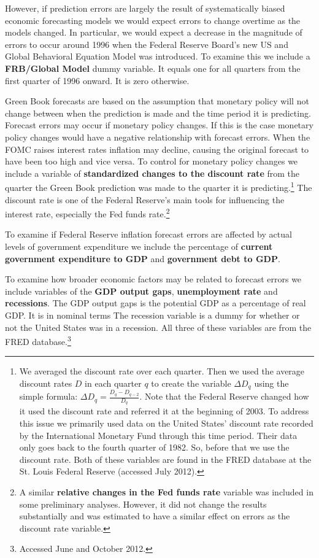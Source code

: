 \documentclass[a4paper]{article}
\begin{document}
However, if prediction errors are largely the result of systematically biased economic forecasting models we would expect errors to change overtime as the models changed. In particular, we would expect a decrease in the magnitude of errors to occur around 1996 when the Federal Reserve Board's new US and Global Behavioral Equation Model was introduced. To examine this we include a {\bf{FRB/Global Model}} dummy variable. It equals one for all quarters from the first quarter of 1996 onward. It is zero otherwise.

Green Book forecasts are based on the assumption that monetary policy will not change between when the prediction is made and the time period it is predicting. Forecast errors may occur if monetary policy changes. If this is the case monetary policy changes would have a negative relationship with forecast errors. When the FOMC raises interest rates inflation may decline, causing the original forecast to have been too high and vice versa. To control for monetary policy changes we include a variable of {\bf{standardized changes to the discount rate}} from the quarter the Green Book prediction was made to the quarter it is predicting.\footnote{We averaged the discount rate over each quarter. Then we used the average discount rates $D$ in each quarter $q$ to create the variable $\Delta D_{q}$ using the simple formula: $\Delta D_{q} = \frac{D_{q} - D_{q-2}}{D_{q}}$. Note that the Federal Reserve changed how it used the discount rate and referred it at the beginning of 2003. To address this issue we primarily used data on the United States' discount rate recorded by the International Monetary Fund through this time period. Their data only goes back to the fourth quarter of 1982. So, before that we use the discount rate. Both of these variables are found in the FRED database at the St. Louis Federal Reserve (accessed July 2012). } The discount rate is one of the Federal Reserve's main tools for influencing the interest rate, especially the Fed funds rate.\footnote{A similar {\bf{relative changes in the Fed funds rate}} variable was included in some preliminary analyses. However, it did not change the results substantially and was estimated to have a similar effect on errors as the discount rate variable.}

To examine if Federal Reserve inflation forecast errors are affected by actual levels of government expenditure we include the percentage of {\bf{current government expenditure to GDP}} and {\bf{government debt to GDP}}. 

To examine how broader economic factors may be related to forecast errors we include variables of the {\bf{GDP output gaps}}, {\bf{unemployment rate}} and {\bf{recessions}}. The GDP output gaps is the potential GDP as a percentage of real GDP. It is in nominal terms The recession variable is a dummy for whether or not the United States was in a recession. All three of these variables are from the FRED database.\footnote{Accessed June and October 2012.} 
\end{document}
